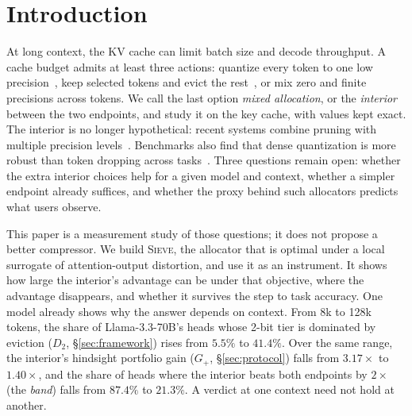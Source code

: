 \documentclass{article}
\newcommand{\sieve}{\textsc{Sieve}}
\newcommand{\gplus}{G_{+}}
\theoremstyle{definition}
\begin{document}
\section{Introduction}
\label{sec:intro}

At long context, the KV cache can limit batch size and decode throughput.  A cache budget admits at least three actions: quantize every token to one low precision~\citep{liu2024kivi,hooper2024kvquant,zandieh2025turboquant}, keep selected tokens and evict the rest~\citep{zhang2023h2o,liu2023scissorhands,li2024snapkv,xiao2024streamingllm}, or mix zero and finite precisions across tokens.  We call the last option \emph{mixed allocation}, or the \emph{interior} between the two endpoints, and study it on the key cache, with values kept exact.  The interior is no longer hypothetical: recent systems combine pruning with multiple precision levels~\citep{zhang2025diffkv,wang-etal-2026-hqekv}.  Benchmarks also find that dense quantization is more robust than token dropping across tasks~\citep{yuan2024kvbench}.  Three questions remain open: whether the extra interior choices help for a given model and context, whether a simpler endpoint already suffices, and whether the proxy behind such allocators predicts what users observe.

This paper is a measurement study of those questions; it does not propose a better compressor.  We build \sieve{}, the allocator that is optimal under a local surrogate of attention-output distortion, and use it as an instrument.  It shows how large the interior's advantage can be under that objective, where the advantage disappears, and whether it survives the step to task accuracy.  One model already shows why the answer depends on context.  From 8k to 128k tokens, the share of Llama-3.3-70B's heads whose 2-bit tier is dominated by eviction ($D_2$, \S\ref{sec:framework}) rises from $5.5\%$ to $41.4\%$.  Over the same range, the interior's hindsight portfolio gain ($\gplus$, \S\ref{sec:protocol}) falls from $3.17\times$ to $1.40\times$, and the share of heads where the interior beats both endpoints by $2\times$ (the \emph{band}) falls from $87.4\%$ to $21.3\%$.  A verdict at one context need not hold at another.
\end{document}
